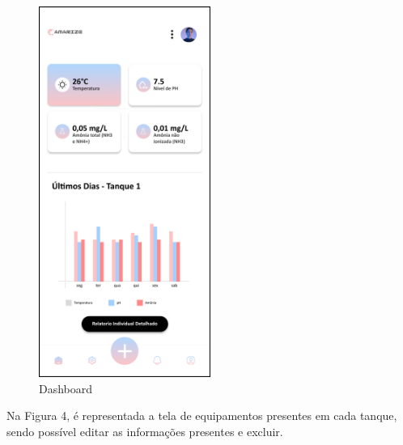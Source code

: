 \begin{figure}[!htb]
\centering
{}
\caption{Dashboard}%
\label{fig:tela-dashboard}
\includegraphics[width = 0.5\textwidth]{Imagem/Dashboard.png}
\end{figure}

\newpage

Na Figura 4, é representada a tela de equipamentos presentes em cada tanque, sendo possível editar as informações presentes e excluir.

